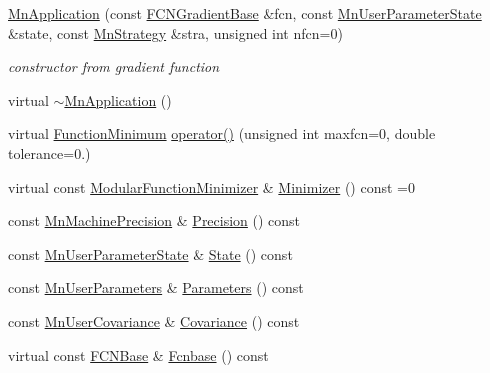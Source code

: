 \begin{DoxyCompactItemize}
\mbox{\hyperlink{classROOT_1_1Minuit2_1_1MnApplication_a07b6eb3c240c0d2360d466ab1f1a85ec}{Mn\+Application}} (const \mbox{\hyperlink{classROOT_1_1Minuit2_1_1FCNGradientBase}{F\+C\+N\+Gradient\+Base}} \&fcn, const \mbox{\hyperlink{classROOT_1_1Minuit2_1_1MnUserParameterState}{Mn\+User\+Parameter\+State}} \&state, const \mbox{\hyperlink{classROOT_1_1Minuit2_1_1MnStrategy}{Mn\+Strategy}} \&stra, unsigned int nfcn=0)
\begin{DoxyCompactList}\small\item\em constructor from gradient function \end{DoxyCompactList}\item 
virtual \mbox{\hyperlink{classROOT_1_1Minuit2_1_1MnApplication_ab8f38ab869bbfe082a2dbcefe1fb19de}{$\sim$\+Mn\+Application}} ()
\item 
virtual \mbox{\hyperlink{classROOT_1_1Minuit2_1_1FunctionMinimum}{Function\+Minimum}} \mbox{\hyperlink{classROOT_1_1Minuit2_1_1MnApplication_a67d746cf939174c8da6552636a11154a}{operator()}} (unsigned int maxfcn=0, double tolerance=0.)
\item 
virtual const \mbox{\hyperlink{classROOT_1_1Minuit2_1_1ModularFunctionMinimizer}{Modular\+Function\+Minimizer}} \& \mbox{\hyperlink{classROOT_1_1Minuit2_1_1MnApplication_a5a8e1e2658b731b5f4023dd1b1594223}{Minimizer}} () const =0
\item 
const \mbox{\hyperlink{classROOT_1_1Minuit2_1_1MnMachinePrecision}{Mn\+Machine\+Precision}} \& \mbox{\hyperlink{classROOT_1_1Minuit2_1_1MnApplication_a8de6eb3be52721cec183ba830504e7bc}{Precision}} () const
\item 
const \mbox{\hyperlink{classROOT_1_1Minuit2_1_1MnUserParameterState}{Mn\+User\+Parameter\+State}} \& \mbox{\hyperlink{classROOT_1_1Minuit2_1_1MnApplication_ac82c0ac40ced7cf8904dc702a79512f7}{State}} () const
\item 
const \mbox{\hyperlink{classROOT_1_1Minuit2_1_1MnUserParameters}{Mn\+User\+Parameters}} \& \mbox{\hyperlink{classROOT_1_1Minuit2_1_1MnApplication_a8a6af4bd7d2f8af8524bca7a67b2f62d}{Parameters}} () const
\item 
const \mbox{\hyperlink{classROOT_1_1Minuit2_1_1MnUserCovariance}{Mn\+User\+Covariance}} \& \mbox{\hyperlink{classROOT_1_1Minuit2_1_1MnApplication_abd83494a6b9b808683edc162c28a9888}{Covariance}} () const
\item 
virtual const \mbox{\hyperlink{classROOT_1_1Minuit2_1_1FCNBase}{F\+C\+N\+Base}} \& \mbox{\hyperlink{classROOT_1_1Minuit2_1_1MnApplication_af4eb3fe4927d3a8e0efcd5c6b7100881}{Fcnbase}} () const

\end{DoxyCompactItemize}
